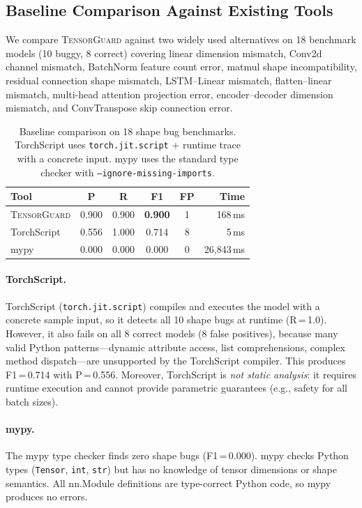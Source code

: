 \documentclass[11pt]{article}
\begin{document}
\subsection{Baseline Comparison Against Existing Tools}\label{sec:baseline-comparison}

We compare \textsc{TensorGuard} against two widely used alternatives
on 18 benchmark models (10 buggy, 8 correct) covering linear dimension
mismatch, Conv2d channel mismatch, BatchNorm feature count error, matmul
shape incompatibility, residual connection shape mismatch, LSTM--Linear
mismatch, flatten--linear mismatch, multi-head attention projection
error, encoder--decoder dimension mismatch, and ConvTranspose skip
connection error.

\begin{table}[t]
\centering
\caption{Baseline comparison on 18 shape bug benchmarks.  TorchScript
  uses \texttt{torch.jit.script} + runtime trace with a concrete
  input.  mypy uses the standard type checker with
  \texttt{--ignore-missing-imports}.}
\label{tab:baseline}
\small
\begin{tabular}{@{}lccccr@{}}
\toprule
\textbf{Tool} & \textbf{P} & \textbf{R} & \textbf{F1} &
  \textbf{FP} & \textbf{Time} \\
\midrule
\textsc{TensorGuard} & 0.900 & 0.900 & \textbf{0.900} & 1 & 168\,ms \\
TorchScript & 0.556 & 1.000 & 0.714 & 8 & 5\,ms \\
mypy & 0.000 & 0.000 & 0.000 & 0 & 26,843\,ms \\
\bottomrule
\end{tabular}
\end{table}

\paragraph{TorchScript.}
TorchScript (\texttt{torch.jit.script}) compiles and executes the
model with a concrete sample input, so it detects all 10 shape bugs at
runtime (R\,=\,1.0).  However, it also fails on all 8 correct models
(8 false positives), because many valid Python patterns---dynamic
attribute access, list comprehensions, complex method dispatch---are
unsupported by the TorchScript compiler.  This produces F1\,=\,0.714
with P\,=\,0.556.  Moreover, TorchScript is \emph{not static analysis}:
it requires runtime execution and cannot provide parametric guarantees
(e.g., safety for all batch sizes).

\paragraph{mypy.}
The mypy type checker finds zero shape bugs (F1\,=\,0.000).  mypy
checks Python types (\texttt{Tensor}, \texttt{int}, \texttt{str}) but
has no knowledge of tensor dimensions or shape semantics.  All
nn.Module definitions are type-correct Python code, so mypy produces
no errors.
\end{document}

